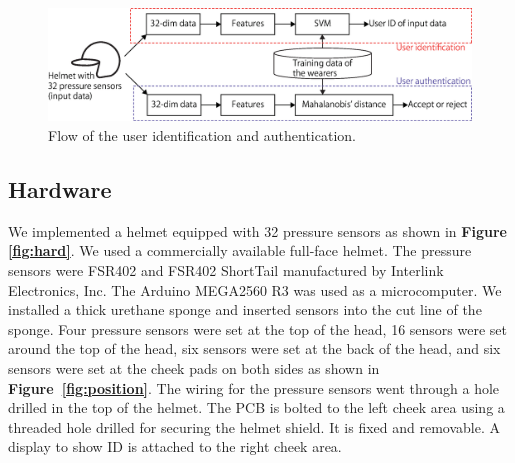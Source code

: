 \documentclass[sigchi,authordraft]{acmart}
\newcommand\figref[1]{\textbf{Figure~\ref{fig:#1}}}
\begin{document}
\begin{figure}[!t]
  \centering
    \includegraphics[width=1\linewidth]{figure/system.eps}
  \caption{Flow of the user identification and authentication.}
  \label{fig:system}
\end{figure}

\subsection{Hardware}\label{sec:hardware}
We implemented a helmet equipped with 32 pressure sensors as shown in {\bf Figure \ref{fig:hard}}. 
We used a commercially available full-face helmet. The pressure sensors were FSR402 and FSR402 ShortTail manufactured by Interlink Electronics, Inc. The Arduino MEGA2560 R3 was used as a microcomputer. We installed a thick urethane sponge and inserted sensors into the cut line of the sponge.
Four pressure sensors were set at the top of the head, 16 sensors were set around the top of the head, six sensors were set at the back of the head, and six sensors were set at the cheek pads on both sides
as shown in \figref{position}. The wiring for the pressure sensors went through a hole drilled in the top of the helmet.
The PCB is bolted to the left cheek area using a threaded hole drilled for securing the helmet shield. It is fixed and removable. A display to show ID is attached to the right cheek area.
\end{document}
